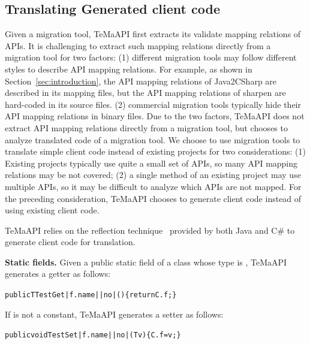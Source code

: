 \subsection{Translating Generated client code}
\label{sec:approach:generating}
Given a migration tool, TeMaAPI first extracts its validate mapping relations of APIs. It is challenging to extract such mapping relations directly from a migration tool for two factors: (1) different migration tools may follow different styles to describe API mapping relations. For example, as shown in Section~\ref{sec:introduction}, the API mapping relations of Java2CSharp are described in its mapping files, but the API mapping relations of sharpen are hard-coded in its source files. (2) commercial migration tools typically hide their API mapping relations in binary files. Due to the two factors, TeMaAPI does not extract API mapping relations directly from a migration tool, but chooses to analyze translated code of a migration tool. We choose to use migration tools to translate simple client code instead of existing projects for two considerations: (1) Existing projects typically use quite a small set of APIs, so many API mapping relations may be not covered; (2) a single method of an existing project may use multiple APIs, so it may be difficult to analyze which APIs are not mapped. For the preceding consideration, TeMaAPI chooses to generate client code instead of using existing client code.

TeMaAPI relies on the reflection technique~\cite{maes1987concepts} provided by both Java and C\# to generate client code for translation.

\textbf{Static fields.} Given a public static field  of a class  whose type is , TeMaAPI generates a getter as follows:
\begin{CodeOut}%
\begin{alltt}
 public T TestGet|f.name||no|()\{ return C.f; \}
\end{alltt}
\end{CodeOut}

If  is not a constant, TeMaAPI generates a setter as follows:
\begin{CodeOut}%
\begin{alltt}
 public void TestSet|f.name||no|(T v)\{ C.f = v; \}
\end{alltt}
\end{CodeOut}

